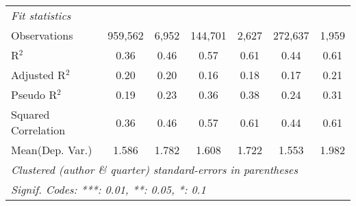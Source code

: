 \begin{tabular}{lcccccc}
   \midrule
   \emph{Fit statistics}\\
   Observations                                               & 959,562        & 6,952        & 144,701      & 2,627   & 272,637        & 1,959\\  
   R$^2$                                                      & 0.36           & 0.46         & 0.57         & 0.61    & 0.44           & 0.61\\  
   Adjusted R$^2$                                             & 0.20           & 0.20         & 0.16         & 0.18    & 0.17           & 0.21\\  
   Pseudo R$^2$                                               & 0.19           & 0.23         & 0.36         & 0.38    & 0.24           & 0.31\\  
   Squared Correlation                                        & 0.36           & 0.46         & 0.57         & 0.61    & 0.44           & 0.61\\  
Mean(Dep. Var.) & 1.586 & 1.782 & 1.608 & 1.722 & 1.553 & 1.982 \\
   \midrule \midrule
   \multicolumn{7}{l}{\emph{Clustered (author \& quarter) standard-errors in parentheses}}\\
   \multicolumn{7}{l}{\emph{Signif. Codes: ***: 0.01, **: 0.05, *: 0.1}}\\
\end{tabular}
\par\endgroup

